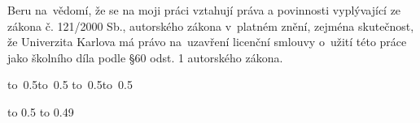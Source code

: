 \medskip\noindent
Beru na~vědomí, že se na moji práci vztahují práva a povinnosti vyplývající
ze zákona č. 121/2000 Sb., autorského zákona v~platném znění, zejména skutečnost,
že Univerzita Karlova má právo na~uzavření licenční smlouvy o~užití této
práce jako školního díla podle §60 odst. 1 autorského zákona.

\vspace{10mm}

\hbox{\hbox to 0.5\hbox to 0.5\hsize{\dotfill\quad}}
\smallskip
\hbox{\hbox to 0.5\hsize{}\hbox to 0.5}

\vspace{20mm}
\newpage


\openright

\noindent
\Podekovani

\newpage


\openright

\vbox to 0.5
\newpage \openright %
\vbox to 0.49

\newpage

\openright
\pagestyle{plain}
\setcounter{page}{1}
